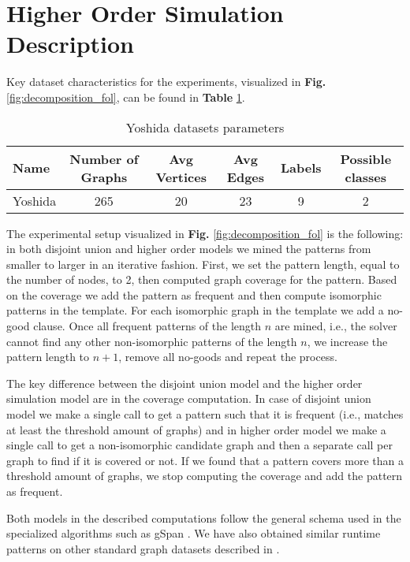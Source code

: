 \newpage
\appendix
\section{Higher Order Simulation Description}
\label{sec:hol_description}
Key dataset characteristics for the experiments, visualized in \textbf{Fig.} \ref{fig:decomposition_fol}, can be found in \textbf{Table} \ref{table:yoshida}.
\begin{table}[thb]
  \caption{Yoshida datasets parameters}
  \label{table:yoshida}
  \begin{tabular}{l c c c c c}
    Name & Number of Graphs & Avg Vertices & Avg Edges & Labels & Possible classes\\
    \hline
    Yoshida & 265 & 20 &  23 &  9 & 2
  \end{tabular}
\end{table}

The experimental setup visualized in \textbf{Fig.} \ref{fig:decomposition_fol} is the following: in both disjoint union and higher order models we mined the patterns from smaller to larger in an iterative fashion. First, we set the pattern length, equal to the number of nodes, to 2, then computed graph coverage for the pattern. Based on the coverage we add the pattern as frequent and then compute isomorphic patterns in the template. For each isomorphic graph in the template we add a no-good clause. Once all frequent patterns of the length $n$ are mined, i.e., the solver cannot find any other non-isomorphic patterns of the length $n$, we increase the pattern length to $n+1$, remove all no-goods and repeat the process.

The key difference between the disjoint union model and the higher order simulation model are in the coverage computation. In case of disjoint union model we make a single call to get a pattern such that it is frequent (i.e., matches at least the threshold amount of graphs) and in higher order model we make a single call to get a non-isomorphic candidate graph and then a separate call per graph to find if it is covered or not. If we found that a pattern covers more than a threshold amount of graphs, we stop computing the coverage and add the pattern as frequent.

Both models in the described computations follow the general schema used in the specialized algorithms such as gSpan \cite{gspan}. We have also obtained similar runtime patterns on other standard graph datasets described in \cite{ilp_graph_mining}.


